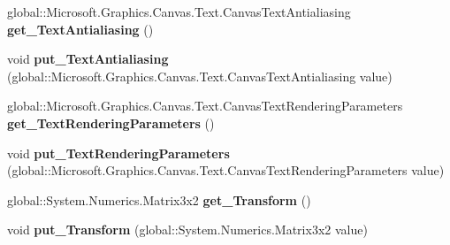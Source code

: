 \begin{DoxyCompactItemize}
\item 
\mbox{\label{interface_microsoft_1_1_graphics_1_1_canvas_1_1_i_canvas_drawing_session_a7e960d3e2378dfba2a062e1d56223a32}} 
global\+::\+Microsoft.\+Graphics.\+Canvas.\+Text.\+Canvas\+Text\+Antialiasing {\bfseries get\+\_\+\+Text\+Antialiasing} ()
\item 
\mbox{\label{interface_microsoft_1_1_graphics_1_1_canvas_1_1_i_canvas_drawing_session_ac0f6157312e1c0048a7ff516cdadfbad}} 
void {\bfseries put\+\_\+\+Text\+Antialiasing} (global\+::\+Microsoft.\+Graphics.\+Canvas.\+Text.\+Canvas\+Text\+Antialiasing value)
\item 
\mbox{\label{interface_microsoft_1_1_graphics_1_1_canvas_1_1_i_canvas_drawing_session_a944db9f21e80cff0087f0cc6976beacd}} 
global\+::\+Microsoft.\+Graphics.\+Canvas.\+Text.\+Canvas\+Text\+Rendering\+Parameters {\bfseries get\+\_\+\+Text\+Rendering\+Parameters} ()
\item 
\mbox{\label{interface_microsoft_1_1_graphics_1_1_canvas_1_1_i_canvas_drawing_session_ae5b9fe79703be83889afe0433b32cc3b}} 
void {\bfseries put\+\_\+\+Text\+Rendering\+Parameters} (global\+::\+Microsoft.\+Graphics.\+Canvas.\+Text.\+Canvas\+Text\+Rendering\+Parameters value)
\item 
\mbox{\label{interface_microsoft_1_1_graphics_1_1_canvas_1_1_i_canvas_drawing_session_ac927f4306a74e89e87f415ac35750001}} 
global\+::\+System.\+Numerics.\+Matrix3x2 {\bfseries get\+\_\+\+Transform} ()
\item 
\mbox{\label{interface_microsoft_1_1_graphics_1_1_canvas_1_1_i_canvas_drawing_session_af2b5485855526d609a881dabe07b65e8}} 
void {\bfseries put\+\_\+\+Transform} (global\+::\+System.\+Numerics.\+Matrix3x2 value)
\item 
\mbox{\label{interface_microsoft_1_1_graphics_1_1_canvas_1_1_i_canvas_drawing_session_a6137a24e6d4c06b3b287662d213228aa}} 

\end{DoxyCompactItemize}
